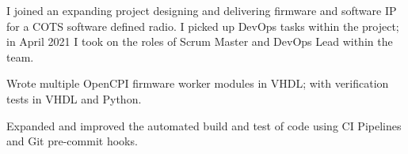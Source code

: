 \sectionsep{}
I joined an expanding project designing and delivering firmware and software IP for a COTS software defined radio. I picked up DevOps tasks within the project; in April 2021 I took on the roles of Scrum Master and DevOps Lead within the team.
\vspace{0.25em}
\begin{tightemize}
    \item Wrote multiple OpenCPI firmware worker modules in VHDL; with verification tests in VHDL and Python.
    \item Expanded and improved the automated build and test of code using CI Pipelines and Git pre-commit hooks.
\end{tightemize}
\sectionsep{}
